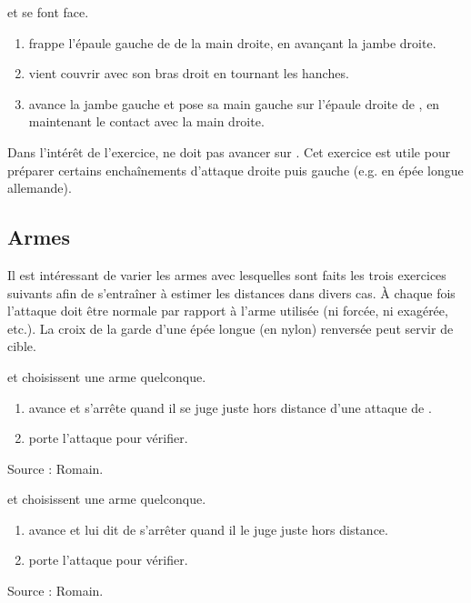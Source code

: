 \begin{exercice}
\label{struct:ex:frappe-gauche-droite}

\A et \D se font face.

\begin{enumerate}
	\item \A frappe l'épaule gauche de \D de la main droite, en avançant la jambe droite.
	\item \D vient couvrir avec son bras droit en tournant les hanches.
	\item \A avance la jambe gauche et pose sa main gauche sur l'épaule droite de \D, en maintenant le contact avec la main droite.
\end{enumerate}

Dans l'intérêt de l'exercice, \D ne doit pas avancer sur \A.
Cet exercice est utile pour préparer certains enchaînements d'attaque droite puis gauche (e.g.
en épée longue allemande).

\end{exercice}


\subsection{Armes}


Il est intéressant de varier les armes avec lesquelles sont faits les trois exercices suivants afin de s'entraîner à estimer les distances dans divers cas.
À chaque fois l'attaque doit être normale par rapport à l'arme utilisée (ni forcée, ni exagérée, etc.).
La croix de la garde d'une épée longue (en nylon) renversée peut servir de cible.


\begin{exercice}
\A et \D choisissent une arme quelconque.

\begin{enumerate}
	\item \A avance et s'arrête quand il se juge juste hors distance d'une attaque de \D.
	
	\item \D porte l'attaque pour vérifier.
\end{enumerate}

Source : Romain.

\end{exercice}


\begin{exercice}
\A et \D choisissent une arme quelconque.

\begin{enumerate}
	\item \A avance et \D lui dit de s'arrêter quand il le juge juste hors distance.
	
	\item \A porte l'attaque pour vérifier.
\end{enumerate}

Source : Romain.

\end{exercice}


